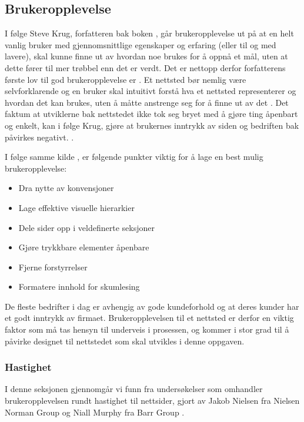 \subsection{Brukeropplevelse}
\label{sec:ux}
I følge Steve Krug, forfatteren bak boken , går brukeropplevelse ut på at en helt vanlig bruker med gjennomsnittlige egenskaper og erfaring (eller til og med lavere), skal kunne finne ut av hvordan noe brukes for å oppnå et mål, uten at dette fører til mer trøbbel enn det er verdt.
Det er nettopp derfor forfatterens første lov til god brukeropplevelse er . Et nettsted bør nemlig være selvforklarende og en bruker skal intuitivt forstå hva et nettsted representerer og hvordan det kan brukes, uten å måtte anstrenge seg for å finne ut av det \cite[s.~11]{krug2014dmt}. Det faktum at utviklerne bak nettstedet ikke tok seg bryet med å gjøre ting åpenbart og enkelt, kan i følge Krug, gjøre at brukernes inntrykk av siden og bedriften bak påvirkes negativt.
\cite[s.~15]{krug2014dmt}.

I følge samme kilde \cite[s.~29]{krug2014dmt}, er følgende punkter viktig for å lage en best mulig brukeropplevelse:
\begin{itemize}
    \item Dra nytte av konvensjoner
    \item Lage effektive visuelle hierarkier
    \item Dele sider opp i veldefinerte seksjoner
    \item Gjøre trykkbare elementer åpenbare
    \item Fjerne forstyrrelser
    \item Formatere innhold for skumlesing
\end{itemize}

De fleste bedrifter i dag er avhengig av gode kundeforhold og at deres kunder har et godt inntrykk av firmaet. Brukeropplevelsen til et nettsted er derfor en viktig faktor som må tas hensyn til underveis i prosessen, og kommer i stor grad til å påvirke designet til nettstedet som skal utvikles i denne oppgaven.

\subsubsection{Hastighet}
I denne seksjonen gjennomgår vi funn fra undersøkelser som omhandler brukeropplevelsen rundt hastighet til nettsider, gjort av Jakob Nielsen fra Nielsen Norman Group \cite{nngroupWebsiteResponseTimes} og Niall Murphy fra Barr Group \cite{barrgroupReponseTimingUI}. 

